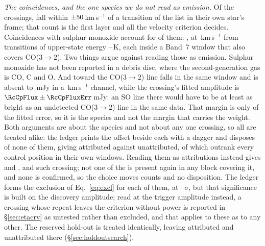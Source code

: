 \begin{table}
\centering
\footnotesize
\caption{The line mask, by species: the number of transitions $N$ it holds,
the frequency range they span inside the searched intervals and their
upper-state energies. Hydrogen recombination lines carry no tabulated
$E_{\rm u}$.}
\label{tab:masklines}

\end{table}

\emph{The coincidences, and the one species we do not read as emission.} Of
the \NCross{} crossings, \MkNCoinc{} fall within
$\pm50$\,km\,s$^{-1}$ of a transition of the list in their own
star's frame; that count is the first layer and all the velocity criterion
decides. Coincidences with sulphur monoxide account for \MkNSODecide{} of them:
\MkSOStars, at \MkSODvList\,km\,s$^{-1}$ from transitions of upper-state
energy \MkSOEuLo--\MkSOEuHi\,K, each inside a Band~7 window that also covers
CO($3\to2$). Two things argue against reading those as emission.
Sulphur monoxide has not been reported in a debris disc, where the
second-generation gas is CO, C and O. And toward \FrCpStar{} the CO($3\to2$)
line falls in the same window and is absent to \FrCpCoLimMJy\,mJy in a
\FrCpCoChanKms\,km\,s$^{-1}$ channel, while the crossing's fitted amplitude is
$\RcCpFlux\pm\RcCpFluxErr$\,mJy: an SO line there would have to be at
least as bright as an undetected CO($3\to2$) line in the same data. That
margin is only \RqAmpSigmaCp{} of the fitted error, so it is the species and
not the margin that carries the weight. Both arguments are about the species
and
not about any one crossing, so all \MkNSODecide{} are treated alike:
the ledger prints the offset beside each with a dagger and
disposes of none of them, giving \MkAttr{} attributed against \MkUnattr{}
unattributed, of which \MkRankLeadWord{} outrank every control position in
their own windows.
Reading them as attributions instead gives \MkAttrAlt{} and \MkUnattrAlt,
and \MkRankLeadAlt{} such crossing; not one of the \MkNSODecide{} is present
again in any block covering it, and none is confirmed, so the choice moves
counts and no disposition. The ledger forms the exclusion of
Eq.~\ref{eq:excl} for each of them, at
\MkAttrExclLo--\MkAttrExclHi$\sigma$, but that significance is built on the
discovery amplitude; read at the trigger amplitude instead, a crossing whose
repeat leaves the criterion without power is reported in
\S\ref{sec:etacrv} as untested rather than excluded, and that applies to
these as to any other. The reserved hold-out is treated identically, leaving
\HoNAttr{}
attributed and \HoNUnattr{} unattributed there (\S\ref{sec:holdoutsearch}).

